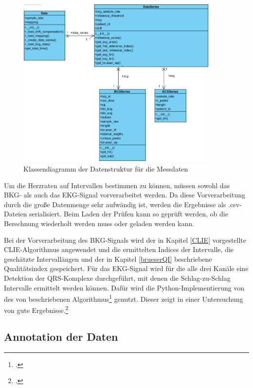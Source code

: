 	\begin{figure}[H]
		\centering
		\includegraphics[width=0.9\textwidth]{pic/data-prep-class.png}
		\caption[Klassendiagramm der Datenstruktur für die Messdaten]{Klassendiagramm der Datenstruktur für die Messdaten}
		\label{fig:data-prep-class}
	\end{figure}
	
	Um die Herzraten auf Intervallen bestimmen zu können, müssen sowohl das \ac{BKG}- als auch das \ac{EKG}-Signal vorverarbeitet werden. Da diese Vorverarbeitung durch die große Datenmenge sehr aufwändig ist, werden die Ergebnisse als .csv-Dateien serialisiert. Beim Laden der Prüfen kann so geprüft werden, ob die Berechnung wiederholt werden muss oder geladen werden kann.
	
	Bei der Vorverarbeitung des \ac{BKG}-Signals wird der in Kapitel \ref{CLIE} vorgestellte CLIE-Algorithmus angewendet und die ermittelten Indices der Intervalle, die geschätzte Intervallängen und der in Kapitel \ref{brueserQI} beschriebene Qualitätsindex gespeichert. Für das \ac{EKG}-Signal wird für die alle drei Kanäle eine Detektion der QRS-Komplexe durchgeführt, mit denen die Schlag-zu-Schlag Intervalle ermittelt werden können. Dafür wird die Python-Implementierung von \citeauthor{Howell2019} des von \citeauthor{Elgendi2010} beschriebenen Algorithmus\footcite[][]{Elgendi2010} genutzt. Dieser zeigt in einer Untersuchung von \citeauthor{Porr2019} gute Ergebnisse.\footcite[Vgl.][]{Porr2019}
	
	
	\subsection{Annotation der Daten}
	
